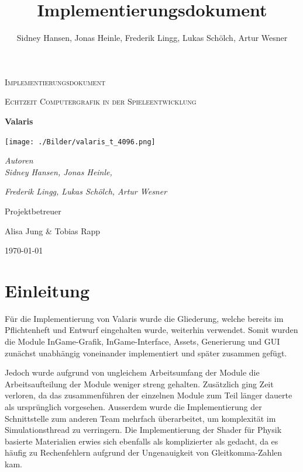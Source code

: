 \documentclass[parskip=full]{scrartcl}
\title{Implementierungsdokument}
\author{Sidney Hansen, Jonas Heinle, Frederik Lingg, Lukas Schölch, Artur Wesner}
\newcommand{\codename}{Valaris}
\begin{document}
	\begin{titlepage}
		\centering
		{\scshape\LARGE Implementierungsdokument\par}
		\vspace{1cm}
		{\scshape\Large Echtzeit Computergrafik in der Spieleentwicklung \par}
		\vspace{1cm}
		{\huge\bfseries \codename \par}
		\vspace{1cm}
		\texttt{[image: ./Bilder/valaris\_t\_4096.png]}
		\par
		{\vspace{1cm}}
		{\Large\itshape Autoren \\}
		{\Large\itshape Sidney Hansen, Jonas Heinle,\\}
		{\Large\itshape Frederik Lingg, Lukas Schölch, Artur Wesner\par}
		
		\vfill
		Projektbetreuer\par
		Alisa Jung \& Tobias Rapp
		
		\vfill
		
		{\large \today\par}
	\end{titlepage}

	\tableofcontents 
	\pagebreak
	
	
	\pagebreak
	
	\section{Einleitung}

	Für die Implementierung von Valaris wurde die Gliederung, welche bereits im Pflichtenheft und Entwurf eingehalten wurde,
	weiterhin verwendet. Somit wurden die Module InGame-Grafik, InGame-Interface, Assets, Generierung und GUI zunächst unabhängig voneinander implementiert
	und später zusammen gefügt.
	
	Jedoch wurde aufgrund von ungleichem Arbeitsumfang der Module die Arbeitsaufteilung der Module weniger streng gehalten.
	Zusätzlich ging Zeit verloren, da das zusammenführen der einzelnen Module zum Teil länger dauerte als ursprünglich vorgesehen.
	Ausserdem wurde die Implementierung der Schnittstelle zum anderen Team mehrfach überarbeitet, um komplexität im Simulationsthread zu verringern.
	Die Implementierung der Shader für Physik basierte Materialien erwies sich ebenfalls als komplizierter als gedacht, da es häufig zu Rechenfehlern
	aufgrund der Ungenauigkeit von Gleitkomma-Zahlen kam.
\end{document}
